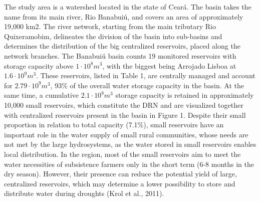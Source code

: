 \documentclass[draft]{agujournal2019}
\begin{document}
The study area is a watershed located in the state of Ceará. The basin takes the name from its main river, Rio Banabuiú, and covers an area of approximately 19,000 km2. The river network, starting from the main tributary Rio Quixeramobim, delineates the division of the basin into sub-basins and determines the distribution of the big centralized reservoirs, placed along the network branches. The Banabuiú basin counts 19 monitored reservoirs with storage capacity above $1\cdot10^8 m^3$, with the biggest being Arrojado Lisboa at $1.6\cdot10^9 m^3$. These reservoirs, listed in Table 1, are centrally managed and account for $2.79\cdot10^9 m^3$, 93\% of the overall water storage capacity in the basin. At the same time, a cumulative $2.1\cdot10^8 m^3$ storage capacity is retained in approximately 10,000 small reservoirs, which constitute the DRN and are visualized together with centralized reservoirs present in the basin in Figure 1. Despite their small proportion in relation to total capacity (7.1\%), small reservoirs have an important role in the water supply of small rural communities, whose needs are not met by the large hydrosystems, as the water stored in small reservoirs enables local distribution. In the region, most of the small reservoirs aim to meet the water necessities of subsistence farmers only in the short term (6-8 months in the dry season). However, their presence can reduce the potential yield of large, centralized reservoirs, which may determine a lower possibility to store and distribute water during droughts (Krol et al., 2011).
\end{document}
